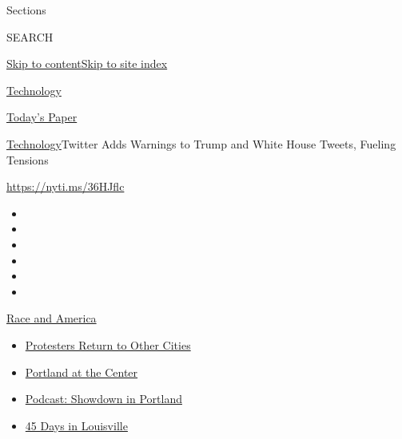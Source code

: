 Sections

SEARCH

\protect\hyperlink{site-content}{Skip to
content}\protect\hyperlink{site-index}{Skip to site index}

\href{https://www.nytimes.com/section/technology}{Technology}

\href{https://myaccount.nytimes.com/auth/login?response_type=cookie\&client_id=vi}{}

\href{https://www.nytimes.com/section/todayspaper}{Today's Paper}

\href{/section/technology}{Technology}\textbar{}Twitter Adds Warnings to
Trump and White House Tweets, Fueling Tensions

\url{https://nyti.ms/36HJflc}

\begin{itemize}
\item
\item
\item
\item
\item
\item
\end{itemize}

\href{https://www.nytimes.com/news-event/george-floyd-protests-minneapolis-new-york-los-angeles?action=click\&pgtype=Article\&state=default\&region=TOP_BANNER\&context=storylines_menu}{Race
and America}

\begin{itemize}
\tightlist
\item
  \href{https://www.nytimes.com/2020/07/26/us/protests-portland-seattle-trump.html?action=click\&pgtype=Article\&state=default\&region=TOP_BANNER\&context=storylines_menu}{Protesters
  Return to Other Cities}
\item
  \href{https://www.nytimes.com/2020/07/24/us/portland-oregon-protests-white-race.html?action=click\&pgtype=Article\&state=default\&region=TOP_BANNER\&context=storylines_menu}{Portland
  at the Center}
\item
  \href{https://www.nytimes.com/2020/07/23/podcasts/the-daily/portland-protests.html?action=click\&pgtype=Article\&state=default\&region=TOP_BANNER\&context=storylines_menu}{Podcast:
  Showdown in Portland}
\item
  \href{https://www.nytimes.com/interactive/2020/07/16/us/black-lives-matter-protests-louisville-breonna-taylor.html?action=click\&pgtype=Article\&state=default\&region=TOP_BANNER\&context=storylines_menu}{45
  Days in Louisville}
\end{itemize}


